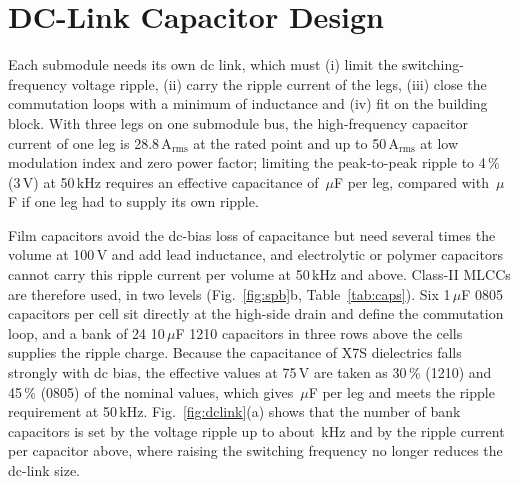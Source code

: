 \documentclass[conference]{IEEEtran}
\newcommand{\uF}{\ensuremath{\mu}F}
\begin{document}
\section{DC-Link Capacitor Design}\label{sec:dclink}
Each submodule needs its own dc link, which must (i) limit the switching-frequency voltage ripple, (ii) carry the ripple current of the legs, (iii) close the commutation loops with a minimum of inductance and (iv) fit on the building block. With three legs on one submodule bus, the high-frequency capacitor current of one leg is 28.8\,A$_\mathrm{rms}$ at the rated point and up to 50\,A$_\mathrm{rms}$ at low modulation index and zero power factor; limiting the peak-to-peak ripple to 4\,\% (3\,V) at 50\,kHz requires an effective capacitance of \CreqBlock\,\uF{} per leg, compared with \CreqAlone\,\uF{} if one leg had to supply its own ripple.

Film capacitors avoid the dc-bias loss of capacitance but need several times the volume at 100\,V and add lead inductance, and electrolytic or polymer capacitors cannot carry this ripple current per volume at 50\,kHz and above. Class-II MLCCs are therefore used, in two levels (Fig.~\ref{fig:spb}b, Table~\ref{tab:caps}). Six 1\,\uF{} 0805 capacitors per cell sit directly at the high-side drain and define the commutation loop, and a bank of 24 10\,\uF{} 1210 capacitors in three rows above the cells supplies the ripple charge. Because the capacitance of X7S dielectrics falls strongly with dc bias, the effective values at 75\,V are taken as 30\,\% (1210) and 45\,\% (0805) of the nominal values, which gives \CeffBlock\,\uF{} per leg and meets the ripple requirement at 50\,kHz. Fig.~\ref{fig:dclink}(a) shows that the number of bank capacitors is set by the voltage ripple up to about \Fcross\,kHz and by the ripple current per capacitor above, where raising the switching frequency no longer reduces the dc-link size.
\end{document}
